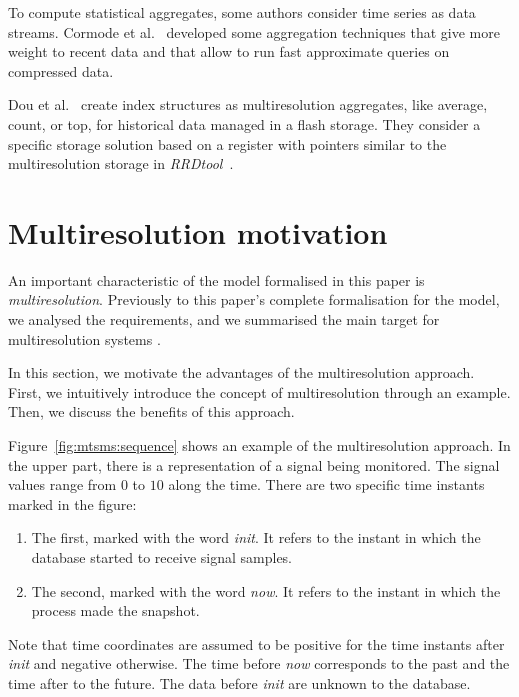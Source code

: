 To compute statistical aggregates, some authors consider time series
as data streams. Cormode et al.~\cite{cormode08:pods} developed some
aggregation techniques that give more weight to recent data and that
allow to run fast approximate queries on compressed data.

Dou et al.~\cite{dou14:historic_queries_flash_storage} create index
structures as multiresolution aggregates, like average, count, or top,
for historical data managed in a flash storage. They consider a specific
storage solution based on a register with pointers similar to the
multiresolution storage in \emph{RRDtool}~\cite{lisa98:oetiker}.


\section{Multiresolution motivation}
\label{sec:features}

An important characteristic of the model formalised in this paper is
\emph{multiresolution}.  Previously to this paper's complete
formalisation for the  model, we analysed the
requirements, and we summarised the main target for multiresolution
systems \cite{llusa13:aiked}.

In this section, we motivate the advantages of the multiresolution
approach. First, we intuitively introduce the concept of
multiresolution through an example. Then, we discuss the benefits of
this approach.

Figure~\ref{fig:mtsms:sequence} shows an example of the
multiresolution approach. In the upper part, there is a representation
of a signal being monitored. The signal values range from $0$ to $10$
along the time. There are two specific time instants marked in the
figure:

\begin{enumerate}

\item The first, marked with the word \emph{init}. It refers to the
  instant in which the database started to receive signal samples.

\item The second, marked with the word \emph{now}. It refers to the
  instant in which the process made the snapshot.

\end{enumerate}

Note that time coordinates are assumed to be positive for the time
instants after \emph{init} and negative otherwise. The time before
\emph{now} corresponds to the past and the time after to the future.
The data before \emph{init} are unknown to the database.


